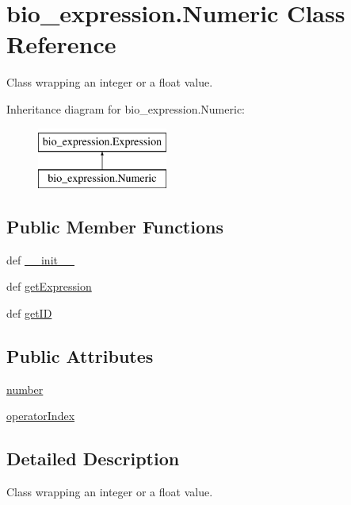 \hypertarget{classbio__expression_1_1_numeric}{\section{bio\+\_\+expression.\+Numeric Class Reference}
\label{classbio__expression_1_1_numeric}
}


Class wrapping an integer or a float value.  


Inheritance diagram for bio\+\_\+expression.\+Numeric\+:\begin{figure}[H]
\begin{center}
\leavevmode
\includegraphics[height=2.000000cm]{d5/dca/classbio__expression_1_1_numeric}
\end{center}
\end{figure}
\subsection*{Public Member Functions}
\begin{DoxyCompactItemize}
\item 
def \hyperlink{classbio__expression_1_1_numeric_a482140823b0e5980ba914e9d6038b210}{\+\_\+\+\_\+init\+\_\+\+\_\+}
\item 
def \hyperlink{classbio__expression_1_1_numeric_a977e2a286c9661f75ebf7acde2442550}{get\+Expression}
\item 
def \hyperlink{classbio__expression_1_1_numeric_ac3197864e11b4ff6a434f18b46a03e9d}{get\+I\+D}
\end{DoxyCompactItemize}
\subsection*{Public Attributes}
\begin{DoxyCompactItemize}
\item 
\hyperlink{classbio__expression_1_1_numeric_a61e657d4d757ba789c0e858d4f71d197}{number}
\item 
\hyperlink{classbio__expression_1_1_numeric_a2536119ab49b2aefa2241202b0d73b19}{operator\+Index}
\end{DoxyCompactItemize}


\subsection{Detailed Description}
Class wrapping an integer or a float value. 

